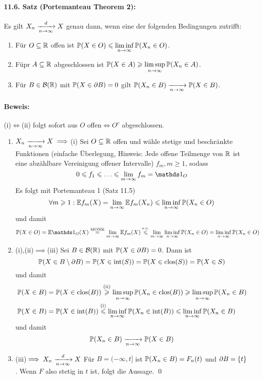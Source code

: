 \documentclass[11pt]{report}
\begin{document}
\paragraph{11.6. Satz (Portemanteau Theorem 2):} Es gilt $X_n\nto{d}{n\to\infty}X$ genau dann, wenn eine der folgenden Bedingungen zutrifft:
\begin{enumerate}[label=(\roman*)]
    \item F\"ur $O\subseteq\mathbb{R}$ offen ist $\mathbb{P}(X\in O)\leqslant\displaystyle\liminf_{n\to\infty}\mathbb{P}(X_n\in O)$.
    \item F\"upr $A\subseteq\mathbb{R}$ abgeschlossen ist $\mathbb{P}(X\in A)\geqslant\displaystyle\limsup_{n\to\infty}\mathbb{P}(X_n\in A)$.
    \item F\"ur $B\in\mathcal{B}(\mathbb{R})$ mit $\mathbb{P}(X\in\partial B)=0$ gilt $\Pp(X_n\in B)\nto{}{n\to\infty}\Pp(X\in B)$.
\end{enumerate}

\paragraph{Beweis:} (i)$\iff$(ii) folgt sofort aus $O$ offen$\iff O^c$ abgeschlossen.
\begin{enumerate}[label=\Roman*.]
    \item $X_n\nto{}{n\to\infty}X\implies$(i)\newline
    Sei $O\subseteq\mathbb{R}$ offen und w\"ahle stetige und beschr\"ankte Funktionen (einfache Überlegung, Hinweis: Jede offene Teilmenge von $\mathbb{R}$ ist eine abzählbare Vereinigung offener Intervalle) $f_m, m\geq 1$, sodass
    $$0\leq f_1\leq\hdots\leq\lim_{m\to\infty}f_m=\ind{O}$$
    Es folgt mit Portemanteau 1 (Satz 11.5)
    $$\forall m\geqslant1:\mathbb{E} f_m(X)=\lim_{n\to\infty}\mathbb{E} f_m(X_n)\leqslant\liminf_{n\to\infty}\mathbb{P}(X_n\in O)$$
    und damit
    $$\Pp(X\in O)=\E \ind{O}(X)\overset{\text{MONK}}{=}\lim_{m\to\infty}\E f_m(X)\overset{\text{s.o.}}{\leq}\lim_{m\to\infty}\liminf_{n\to\infty}\Pp(X_n\in O)=\liminf_{n\to\infty}\Pp(X_n\in O)$$
   \item (i),(ii)$\implies$(iii)\newline
   Sei $B\in\mathcal{B}(\mathbb{R})$ mit $\mathbb{P}(X\in\partial B)=0$. Dann ist
   $$\mathbb{P}(X\in B\setminus\partial B)=\mathbb{P}(X\in\text{int}(S))=\mathbb{P}(X\in\text{clos}(S))=\mathbb{P}(X\in S)$$
   und damit
   \begin{align*}
       &\mathbb{P}(X\in B)=\mathbb{P}(X\in\text{clos}(B))\overset{\text{(ii)}}{\geqslant}\limsup_{n\to\infty}\mathbb{P}(X_n\in\text{clos}(B))\geqslant\limsup_{n\to\infty}\mathbb{P}(X_n\in B) \\
       &\mathbb{P}(X\in B)=\mathbb{P}(X\in\text{int}(B))\overset{\text{(i)}}{\leqslant}\liminf_{n\to\infty}\mathbb{P}(X_n\in\text{int}(B))\leqslant\liminf_{n\to\infty}\mathbb{P}(X_n\in B) 
   \end{align*}
   und damit $$\Pp(X_n\in B)\nto{}{n\to\infty}\Pp(X\in B)$$
   \item (iii)$\implies X_n\nto{d}{n\to\infty}X$\newline
   F\"ur $B=(-\infty, t]$ ist $\mathbb{P}(X_n\in B)=F_n(t)$ und $\partial B=\{t\}$. Wenn $F$ also stetig in $t$ ist, folgt die Aussage. \qed
\end{enumerate}
\end{document}
